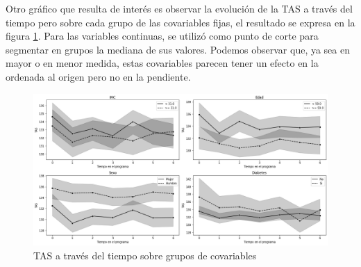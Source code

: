 \documentclass[spanish]{article}
\numberwithin{figure}{subsection}
\numberwithin{equation}{subsection}
\numberwithin{table}{subsection}
\begin{document}
Otro gráfico que resulta de interés es observar la evolución de la TAS a través
del tiempo pero sobre cada grupo de las covariables fijas, el resultado se
expresa en la figura \ref{TAS_with_covs}. Para las variables continuas, se
utilizó como punto de corte para segmentar en grupos la mediana de sus valores.
Podemos observar que, ya sea en mayor o en menor medida, estas covariables
parecen tener un efecto en la ordenada al origen pero no en la pendiente.

\begin{figure}[H]
	\centering
	\includegraphics[scale=0.4]{img/TAS_vs_tpo_with_covs.png}
	\caption{TAS a través del tiempo sobre grupos de covariables}
	\label{TAS_with_covs}
\end{figure}




\newpage
\nocite{*}
\renewcommand{\refname}{Bibliografía}

\end{document}
